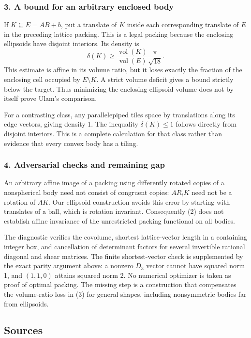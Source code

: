 \documentclass[11pt,a4paper]{article}
\begin{document}
\subsubsection{3. A bound for an arbitrary enclosed body}
If $K\subseteq E=AB+b$, put a translate of $K$ inside each corresponding translate of $E$ in the preceding lattice packing. This is a legal packing because the enclosing ellipsoids have disjoint interiors. Its density is
\[\delta(K)\geq\frac{\operatorname{vol}(K)}{\operatorname{vol}(E)}
\frac\pi{\sqrt{18}}.\tag{3}\]
This estimate is affine in its volume ratio, but it loses exactly the fraction of the enclosing cell occupied by $E\setminus K$. A strict volume deficit gives a bound strictly below the target. Thus minimizing the enclosing ellipsoid volume does not by itself prove Ulam's comparison.

For a contrasting class, any parallelepiped tiles space by translations along its edge vectors, giving density 1. The inequality $\delta(K)\leq1$ follows directly from disjoint interiors. This is a complete calculation for that class rather than evidence that every convex body has a tiling.

\subsubsection{4. Adversarial checks and remaining gap}
An arbitrary affine image of a packing using differently rotated copies of a nonspherical body need not consist of congruent copies: $AR_iK$ need not be a rotation of $AK$. Our ellipsoid construction avoids this error by starting with translates of a ball, which is rotation invariant. Consequently (2) does not establish affine invariance of the unrestricted packing functional on all bodies.

The diagnostic verifies the covolume, shortest lattice-vector length in a containing integer box, and cancellation of determinant factors for several invertible rational diagonal and shear matrices. The finite shortest-vector check is supplemented by the exact parity argument above: a nonzero $D_3$ vector cannot have squared norm 1, and $(1,1,0)$ attains squared norm 2. No numerical optimizer is taken as proof of optimal packing. The missing step is a construction that compensates the volume-ratio loss in (3) for general shapes, including nonsymmetric bodies far from ellipsoids.

\subsection{Sources}
\end{document}
